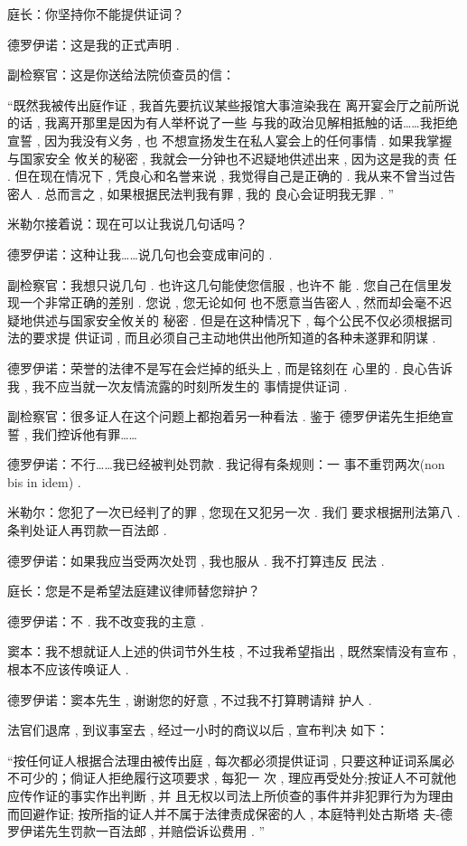 庭长：你坚持你不能提供证词？

德罗伊诺：这是我的正式声明 . 

副检察官：这是你送给法院侦查员的信：

“既然我被传出庭作证 , 我首先要抗议某些报馆大事渲染我在 离开宴会厅之前所说的话 , 我离开那里是因为有人举杯说了一些 与我的政治见解相抵触的话……我拒绝宣誓 , 因为我没有义务 , 也 不想宣扬发生在私人宴会上的任何事情 . 如果我掌握与国家安全 攸关的秘密 , 我就会一分钟也不迟疑地供述出来 , 因为这是我的责 任 . 但在现在情况下 , 凭良心和名誉来说 , 我觉得自己是正确的 .  我从来不曾当过告密人 . 总而言之 , 如果根据民法判我有罪 , 我的 良心会证明我无罪 . ”

米勒尔接着说：现在可以让我说几句话吗？

德罗伊诺：这种让我……说几句也会变成审问的 . 

副检察官：我想只说几句 . 也许这几句能使您信服 , 也许不 能 . 您自己在信里发现一个非常正确的差别 . 您说 , 您无论如何 也不愿意当告密人 , 然而却会毫不迟疑地供述与国家安全攸关的 秘密 . 但是在这种情况下 , 每个公民不仅必须根据司法的要求提 供证词 , 而且必须自己主动地供出他所知道的各种未遂罪和阴谋 . 

德罗伊诺：荣誉的法律不是写在会烂掉的纸头上 , 而是铭刻在 心里的 . 良心告诉我 , 我不应当就一次友情流露的时刻所发生的 事情提供证词 . 

副检察官：很多证人在这个问题上都抱着另一种看法 . 鉴于 德罗伊诺先生拒绝宣誓 , 我们控诉他有罪……

德罗伊诺：不行……我已经被判处罚款 . 我记得有条规则：一 事不重罚两次(non bis in idem) . 

米勒尔：您犯了一次已经判了的罪 , 您现在又犯另一次 . 我们 要求根据刑法第八 . 条判处证人再罚款一百法郎 . 

德罗伊诺：如果我应当受两次处罚 , 我也服从 . 我不打算违反 民法 . 

庭长：您是不是希望法庭建议律师替您辩护？

德罗伊诺：不 . 我不改变我的主意 . 

窦本：我不想就证人上述的供词节外生枝 , 不过我希望指出 ,  既然案情没有宣布 , 根本不应该传唤证人 . 

德罗伊诺：窦本先生 , 谢谢您的好意 , 不过我不打算聘请辩 护人 . 

法官们退席 , 到议事室去 , 经过一小时的商议以后 , 宣布判决 如下：

“按任何证人根据合法理由被传出庭 , 每次都必须提供证词 ,  只要这种证词系属必不可少的；倘证人拒绝履行这项要求 , 每犯一 次 , 理应再受处分;按证人不可就他应传作证的事实作出判断 , 并 且无权以司法上所侦查的事件并非犯罪行为为理由而回避作证; 按所指的证人并不属于法律责成保密的人 , 本庭特判处古斯塔 夫-德罗伊诺先生罚款一百法郎 , 并赔偿诉讼费用 . ”

